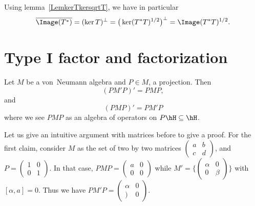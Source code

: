 Using lemma~\ref{LemkerTkersqrtT}, we have in particular
\begin{equation}
	\overline{ \Image(T^*) }=(\ker T)^{\perp}=\big( \ker(T^*T)^{1/2} \big)^{\perp}=\Image(T^*T)^{1/2}.
\end{equation}

\section{Type I factor and factorization}

\begin{lemma}		\label{LemPMPPMPprime}
	Let $M$ be a von~Neumann algebra and $P\in M$, a projection. Then
	\begin{equation}
		(PM'P)'=PMP,
	\end{equation}
	and
	\begin{equation}		\label{EqLemPMPPMPprimedeux}
		(PMP)'=PM'P
	\end{equation}
	where we see $PMP$ as an algebra of operators on $P\hH\subseteq\hH$.
\end{lemma}

Let us give an intuitive argument with matrices before to give a proof. For the first claim, consider $M$ as the set of two by two matrices
$
	\begin{pmatrix}
		a & b \\
		c & d
	\end{pmatrix}
$, and $P=
	\begin{pmatrix}
		1 & 0 \\
		0 & 1
	\end{pmatrix}$. In that case, $PMP=\begin{pmatrix}
		a & 0 \\
		0 & 0
	\end{pmatrix}$ while $M'=\{ \begin{pmatrix}
		\alpha & 0     \\
		0      & \beta
	\end{pmatrix}\}$ with $[\alpha,a]=0$. Thus we have $PM'P=\begin{pmatrix}
		\alpha & 0 \\
		)      & 0
	\end{pmatrix}$.

